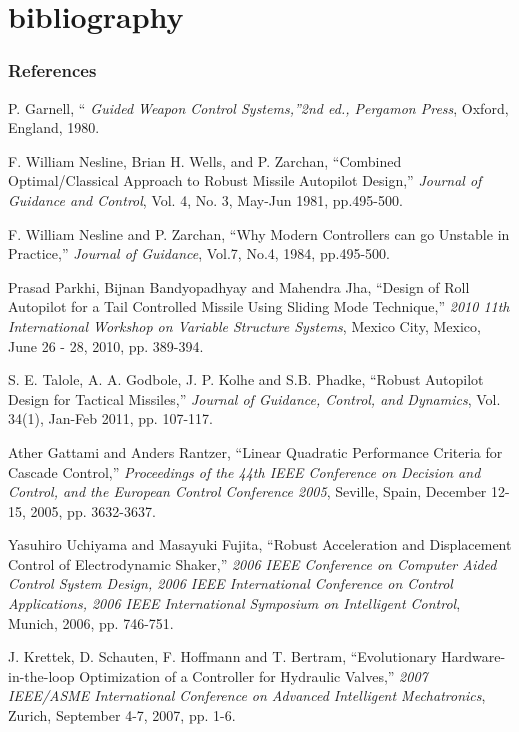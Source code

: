 \documentclass[10pt]{beamer}
\begin{document}
\section{bibliography}
\begin{frame}[allowframebreaks]
\frametitle{References}

%    
%
\begin{thebibliography}{00}

P. Garnell,
{``\it{ Guided Weapon Control Systems},''}\emph{2nd ed., Pergamon Press},
 Oxford, England, 1980.

F. William Nesline, Brian H. Wells, and P. Zarchan,
``Combined Optimal/Classical Approach to Robust Missile Autopilot Design,''
\emph{Journal of Guidance and Control},
Vol. 4, No. 3, May-Jun 1981, pp.495-500.

F. William Nesline and P. Zarchan,
``Why Modern Controllers can go Unstable in Practice,''
\emph{ Journal of Guidance},
Vol.7, No.4, 1984,  pp.495-500.

Prasad Parkhi, Bijnan Bandyopadhyay and Mahendra Jha, ``Design of Roll Autopilot for a Tail Controlled Missile
Using Sliding Mode Technique,'' \emph{2010 11th International Workshop on Variable Structure Systems}, Mexico City, Mexico, June 26 - 28, 2010, pp. 389-394.

S. E. Talole, A. A. Godbole, J. P. Kolhe and S.B. Phadke,
``Robust Autopilot Design for Tactical Missiles,''
\emph{Journal of Guidance, Control, and Dynamics},
Vol. 34(1), Jan-Feb 2011, pp. 107-117.

Ather Gattami and Anders Rantzer,
``Linear Quadratic Performance Criteria for Cascade Control,''
\emph{Proceedings of the 44th IEEE Conference on Decision and Control, and
the European Control Conference 2005},
Seville, Spain, December 12-15, 2005, pp. 3632-3637.

Yasuhiro Uchiyama and Masayuki Fujita,
``Robust Acceleration and Displacement Control of Electrodynamic Shaker,''
\emph{2006 IEEE Conference on Computer Aided Control System Design, 2006 IEEE International Conference on Control Applications, 2006 IEEE International Symposium on Intelligent Control}, Munich, 2006, pp. 746-751.

J. Krettek, D. Schauten, F. Hoffmann and T. Bertram,
``Evolutionary Hardware-in-the-loop Optimization of a Controller for Hydraulic Valves,''
\emph{2007 IEEE/ASME International Conference on Advanced Intelligent Mechatronics},
Zurich, September 4-7, 2007, pp. 1-6.


\end{thebibliography}
\end{frame}
\end{document}
